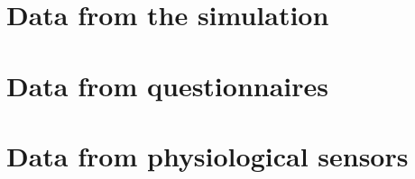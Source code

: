 \section{Data from the simulation}



\section{Data from questionnaires}



\section{Data from physiological sensors}

 